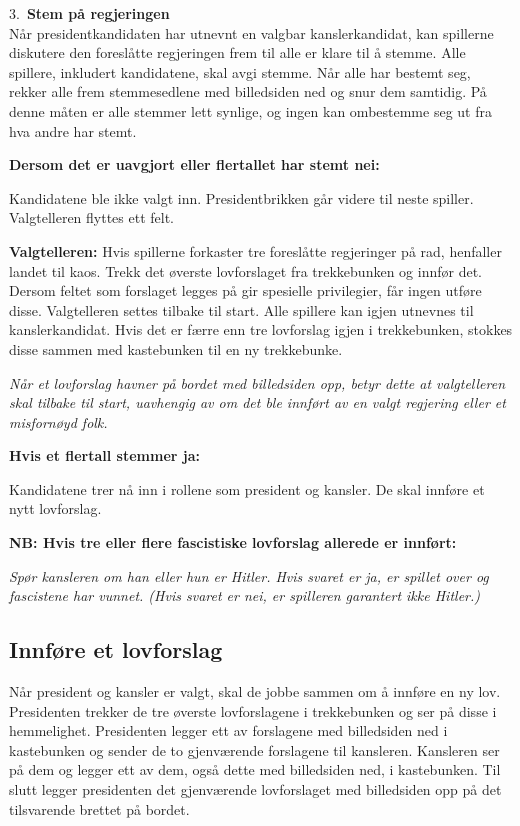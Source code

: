 \documentclass[a4paper, 10pt, twocolumn, twoside]{article}
\begin{document}
3.\ \textbf{Stem på regjeringen}\\
Når presidentkandidaten har utnevnt en valgbar kanslerkandidat, kan spillerne diskutere den foreslåtte regjeringen frem til alle er klare til å stemme. Alle spillere, inkludert kandidatene, skal avgi stemme. Når alle har bestemt seg, rekker alle frem stemmesedlene med billedsiden ned og snur dem samtidig. På denne måten er alle stemmer lett synlige, og ingen kan ombestemme seg ut fra hva andre har stemt.

\textbf{Dersom det er uavgjort eller flertallet har stemt nei:}

Kandidatene ble ikke valgt inn. Presidentbrikken går videre til neste spiller. Valgtelleren flyttes ett felt.

\textbf{Valgtelleren:} Hvis spillerne forkaster tre foreslåtte regjeringer på rad, henfaller landet til kaos. Trekk det øverste lovforslaget fra trekkebunken og innfør det. Dersom feltet som forslaget legges på gir spesielle privilegier, får ingen utføre disse. Valgtelleren settes tilbake til start. Alle spillere kan igjen utnevnes til kanslerkandidat. Hvis det er færre enn tre lovforslag igjen i trekkebunken, stokkes disse sammen med kastebunken til en ny trekkebunke.

\textit{Når et lovforslag havner på bordet med billedsiden opp, betyr dette at valgtelleren skal tilbake til start, uavhengig av om det ble innført av en valgt regjering eller et misfornøyd folk.}

\textbf{Hvis et flertall stemmer ja:}

Kandidatene trer nå inn i rollene som president og kansler. De skal innføre et nytt lovforslag.

\textbf{NB: Hvis tre eller flere fascistiske lovforslag allerede er innført:}

\textit{Spør kansleren om han eller hun er Hitler. Hvis svaret er ja, er spillet over og fascistene har vunnet. (Hvis svaret er nei, er spilleren garantert ikke Hitler.)}

\subsection{Innføre et lovforslag}
Når president og kansler er valgt, skal de jobbe sammen om å innføre en ny lov. Presidenten trekker de tre øverste lovforslagene i trekkebunken og ser på disse i hemmelighet. Presidenten legger ett av forslagene med billedsiden ned i kastebunken og sender de to gjenværende forslagene til kansleren. Kansleren ser på dem og legger ett av dem, også dette med billedsiden ned, i kastebunken. Til slutt legger presidenten det gjenværende lovforslaget med billedsiden opp på det tilsvarende brettet på bordet. 
\end{document}
